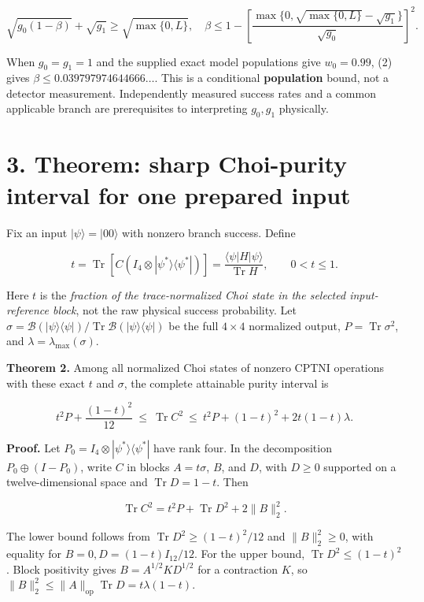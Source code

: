 \documentclass[
  10pt,
  a4paper,
]{article}
\begin{document}
\[
\sqrt{g_0(1-\beta)}+\sqrt{g_1}\ge\sqrt{\max\{0,L\}},
\quad
\beta\le 1-\left[\frac{\max\{0,\sqrt{\max\{0,L\}}-\sqrt{g_1}\}}{\sqrt{g_0}}\right]^2.
\tag{2}
\]

When \(g_0=g_1=1\) and the supplied exact model populations give \(w_0=0.99\), (2) gives \(\beta\le 0.039797974644666\ldots\). This is a conditional \textbf{population} bound, not a detector measurement. Independently measured success rates and a common applicable branch are prerequisites to interpreting \(g_0,g_1\) physically.

\section{3. Theorem: sharp Choi-purity interval for one prepared input}\label{theorem-sharp-choi-purity-interval-for-one-prepared-input}

Fix an input \(|\psi\rangle=|00\rangle\) with nonzero branch success. Define

\[
t=\operatorname{Tr}\left[C\left(I_4\otimes|\psi^*\rangle\langle\psi^*|\right)\right]
=\frac{\langle\psi|H|\psi\rangle}{\operatorname{Tr}H},\qquad 0<t\le1.
\]

Here \(t\) is the \emph{fraction of the trace-normalized Choi state in the selected input-reference block}, not the raw physical success probability. Let \(\sigma=\mathcal B(|\psi\rangle\langle\psi|)/\operatorname{Tr}\mathcal B(|\psi\rangle\langle\psi|)\) be the full \(4\times4\) normalized output, \(P=\operatorname{Tr}\sigma^2\), and \(\lambda=\lambda_{\max}(\sigma)\).

\textbf{Theorem 2.} Among all normalized Choi states of nonzero CPTNI operations with these exact \(t\) and \(\sigma\), the complete attainable purity interval is

\[
\boxed{\quad t^2P+\frac{(1-t)^2}{12}\ \le\ \operatorname{Tr}C^2\ \le\
 t^2P+(1-t)^2+2t(1-t)\lambda.\quad}
\tag{3}
\]

\textbf{Proof.} Let \(P_0=I_4\otimes|\psi^*\rangle\langle\psi^*|\) have rank four. In the decomposition \(P_0\oplus(I-P_0)\), write \(C\) in blocks \(A=t\sigma\), \(B\), and \(D\), with \(D\ge0\) supported on a twelve-dimensional space and \(\operatorname{Tr}D=1-t\). Then

\[\operatorname{Tr}C^2=t^2P+\operatorname{Tr}D^2+2\|B\|_2^2.\]

The lower bound follows from \(\operatorname{Tr}D^2\ge(1-t)^2/12\) and \(\|B\|_2^2\ge0\), with equality for \(B=0,D=(1-t)I_{12}/12\). For the upper bound, \(\operatorname{Tr}D^2\le(1-t)^2\). Block positivity gives \(B=A^{1/2}KD^{1/2}\) for a contraction \(K\), so \(\|B\|_2^2\le \|A\|_{\mathrm{op}}\operatorname{Tr}D=t\lambda(1-t)\).
\end{document}

